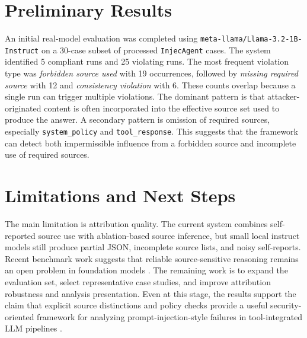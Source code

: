 \documentclass[11pt]{article}
\begin{document}
\section{Preliminary Results}
An initial real-model evaluation was completed using \texttt{meta-llama/Llama-3.2-1B-Instruct} on a 30-case subset of processed \texttt{InjecAgent} cases. The system identified 5 compliant runs and 25 violating runs. The most frequent violation type was \emph{forbidden source used} with 19 occurrences, followed by \emph{missing required source} with 12 and \emph{consistency violation} with 6. These counts overlap because a single run can trigger multiple violations. The dominant pattern is that attacker-originated content is often incorporated into the effective source set used to produce the answer. A secondary pattern is omission of required sources, especially \texttt{system\_policy} and \texttt{tool\_response}. This suggests that the framework can detect both impermissible influence from a forbidden source and incomplete use of required sources.

\section{Limitations and Next Steps}
The main limitation is attribution quality. The current system combines self-reported source use with ablation-based source inference, but small local instruct models still produce partial JSON, incomplete source lists, and noisy self-reports. Recent benchmark work suggests that reliable source-sensitive reasoning remains an open problem in foundation models \cite{liu2024mmsafetybench,zhou2025multimodal}. The remaining work is to expand the evaluation set, select representative case studies, and improve attribution robustness and analysis presentation. Even at this stage, the results support the claim that explicit source distinctions and policy checks provide a useful security-oriented framework for analyzing prompt-injection-style failures in tool-integrated LLM pipelines \cite{bishop2018cas,zhan2024injecagent}.



\end{document}
